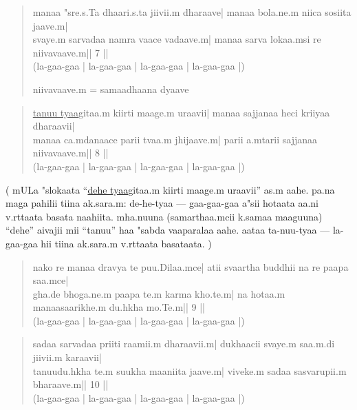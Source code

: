 \documentclass[a6paper]{article}
\begin{document}
    \begin{verse}
        manaa "sre.s.Ta dhaari.s.ta jiivii.m dharaave|
        manaa bola.ne.m niica sosiita jaave.m|\\

        svaye.m sarvadaa namra vaace vadaave.m|
        manaa sarva lokaa.msi re niivavaave.m|| 7 ||\\
        (la-gaa-gaa | la-gaa-gaa | la-gaa-gaa | la-gaa-gaa |)

        niivavaave.m = samaadhaana dyaave
    \end{verse}

    \begin{verse}
        \underline{tanuu tyaa}gitaa.m kiirti maage.m uraavii|
        manaa sajjanaa heci kriiyaa dharaavii|\\

        manaa ca.mdanaace parii tvaa.m jhijaave.m|
        parii a.mtarii sajjanaa niivavaave.m|| 8 ||\\
        (la-gaa-gaa | la-gaa-gaa | la-gaa-gaa | la-gaa-gaa |)
    \end{verse}

    \vspace{2mm}
    \parbox{8cm}
    {
        \small
        {
            (
                mULa "slokaata ``\underline{dehe tyaa}gitaa.m kiirti maage.m uraavii'' as.m aahe.
                pa.na maga pahilii tiina ak.sara.m: de-he-tyaa --- gaa-gaa-gaa 
                a"sii hotaata aa.ni v.rttaata basata naahiita. mha.nuuna 
                (samarthaa.mcii k.samaa maaguuna) ``dehe'' 
                aivajii mii ``tanuu'' haa "sabda vaaparalaa aahe. aataa 
                ta-nuu-tyaa --- la-gaa-gaa hii tiina ak.sara.m v.rttaata basataata.
            )
        }
    }
    \begin{verse}
        nako re manaa dravya te puu.Dilaa.mce|
        atii svaartha buddhii na re paapa saa.mce|\\

        gha.de bhoga.ne.m paapa te.m karma kho.te.m|
        na hotaa.m manaasaarikhe.m du.hkha mo.Te.m|| 9 ||\\
        (la-gaa-gaa | la-gaa-gaa | la-gaa-gaa | la-gaa-gaa |)
    \end{verse}

    \begin{verse}
        sadaa sarvadaa priiti raamii.m dharaavii.m|
        dukhaacii svaye.m saa.m.di jiivii.m karaavii|\\

        tanuudu.hkha te.m suukha maaniita jaave.m|
        viveke.m sadaa sasvarupii.m bharaave.m|| 10 ||\\
        (la-gaa-gaa | la-gaa-gaa | la-gaa-gaa | la-gaa-gaa |)
    \end{verse}
\end{document}
